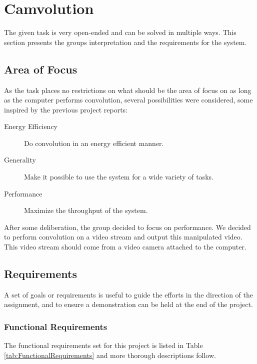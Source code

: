\section{Camvolution}
The given task\cite{assignment-text} is very open-ended and can be solved in multiple ways.
This section presents the groups interpretation and the requirements for the system.

\subsection{Area of Focus}
As the task places no restrictions on what should be the area of focus on as long as the computer performs convolution, several possibilities were considered, some inspired by the previous project reports:

\begin{description}
    \item[Energy Efficiency] Do convolution in an energy efficient manner.
    \item[Generality] Make it possible to use the system for a wide variety of tasks.
    \item[Performance] Maximize the throughput of the system.
\end{description}

After some deliberation,
the group decided to focus on performance.
We decided to perform convolution on a video stream and output this manipulated video.
This video stream should come from a video camera attached to the computer.

\subsection{Requirements}
A set of goals or requirements is useful to guide the efforts in the direction of the assignment, and to ensure a demonstration can be held at the end of the project.

\subsubsection{Functional Requirements}
The functional requirements set for this project is listed in Table \ref{tab:FunctionalRequirements} and more thorough descriptions follow.

